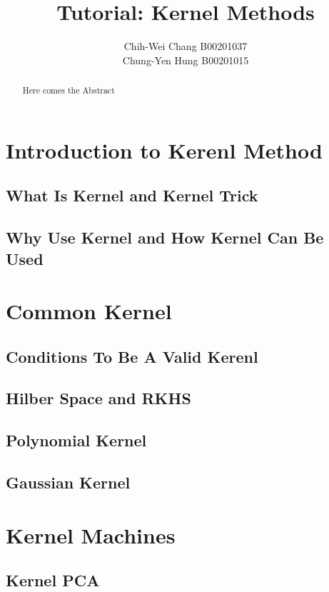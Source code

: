 \documentclass[12pt]{article}
\begin{document}

\title{Tutorial: Kernel Methods}
\author{Chih-Wei Chang B00201037\\
Chung-Yen Hung B00201015}
\maketitle

\begin{abstract}
  Here comes the Abstract
\end{abstract}

\section{Introduction to Kerenl Method}
\subsection{What Is Kernel and Kernel Trick}
\subsection{Why Use Kernel and How Kernel Can Be Used}

\section{Common Kernel}
\subsection{Conditions To Be A Valid Kerenl}
\subsection{Hilber Space and RKHS}
\subsection{Polynomial Kernel}
\subsection{Gaussian Kernel}

\section{Kernel Machines}
\subsection{Kernel PCA}
\end{document}
